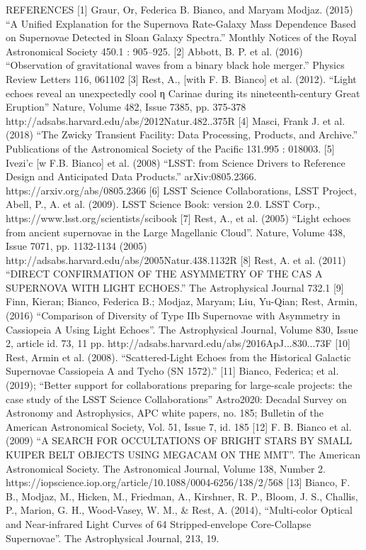 REFERENCES
[1] Graur, Or, Federica B. Bianco, and Maryam Modjaz. (2015) “A Unified Explanation for the Supernova Rate-Galaxy Mass Dependence Based on Supernovae Detected in Sloan Galaxy Spectra.” Monthly Notices of the Royal Astronomical Society 450.1 : 905–925. 
[2] Abbott, B. P. et al. (2016) “Observation of gravitational waves from a binary black hole merger.” Physics Review Letters 116, 061102 
[3] Rest, A., [with F. B. Bianco] et al. (2012). “Light echoes reveal an unexpectedly cool η Carinae during its nineteenth-century Great Eruption” Nature, Volume 482, Issue 7385, pp. 375-378  http://adsabs.harvard.edu/abs/2012Natur.482..375R
[4] Masci, Frank J. et al. (2018) “The Zwicky Transient Facility: Data Processing, Products, and Archive.” Publications of the Astronomical Society of the Pacific 131.995 : 018003. 
[5] Ivezi’c [w F.B. Bianco] et al. (2008) “LSST: from Science Drivers to Reference Design and Anticipated Data Products.” arXiv:0805.2366. https://arxiv.org/abs/0805.2366
[6] LSST Science Collaborations,  LSST Project, Abell, P., A. et al. (2009).  LSST Science Book: version 2.0. LSST Corp., https://www.lsst.org/scientists/scibook 
[7] Rest, A., et al.  (2005) “Light echoes from ancient supernovae in the Large Magellanic Cloud”. Nature, Volume 438, Issue 7071, pp. 1132-1134 (2005) http://adsabs.harvard.edu/abs/2005Natur.438.1132R
[8] Rest, A. et al.  (2011) “DIRECT CONFIRMATION OF THE ASYMMETRY OF THE CAS A SUPERNOVA WITH LIGHT ECHOES.” The Astrophysical Journal 732.1
[9] Finn, Kieran; Bianco, Federica B.; Modjaz, Maryam; Liu, Yu-Qian; Rest, Armin, (2016) “Comparison of Diversity of Type IIb Supernovae with Asymmetry in Cassiopeia A Using Light Echoes”. The Astrophysical Journal, Volume 830, Issue 2, article id. 73, 11 pp.  http://adsabs.harvard.edu/abs/2016ApJ...830...73F
[10] Rest, Armin et al.  (2008). “Scattered-Light Echoes from the Historical Galactic Supernovae Cassiopeia A and Tycho (SN 1572).”
[11] Bianco, Federica; et al. (2019); “Better support for collaborations preparing for large-scale projects: the case study of the LSST Science Collaborations” Astro2020: Decadal Survey on Astronomy and Astrophysics, APC white papers, no. 185; Bulletin of the American Astronomical Society, Vol. 51, Issue 7, id. 185 
[12] F. B. Bianco et al. (2009) “A SEARCH FOR OCCULTATIONS OF BRIGHT STARS BY SMALL KUIPER BELT OBJECTS USING MEGACAM ON THE MMT”. The American Astronomical Society. The Astronomical Journal, Volume 138, Number 2. https://iopscience.iop.org/article/10.1088/0004-6256/138/2/568
[13] Bianco, F. B., Modjaz, M., Hicken, M., Friedman, A., Kirshner, R. P., Bloom, J. S., Challis, P., Marion, G. H., Wood-Vasey, W. M., & Rest, A. (2014), “Multi-color Optical and Near-infrared Light Curves of 64 Stripped-envelope Core-Collapse Supernovae”. The Astrophysical Journal, 213, 19.
